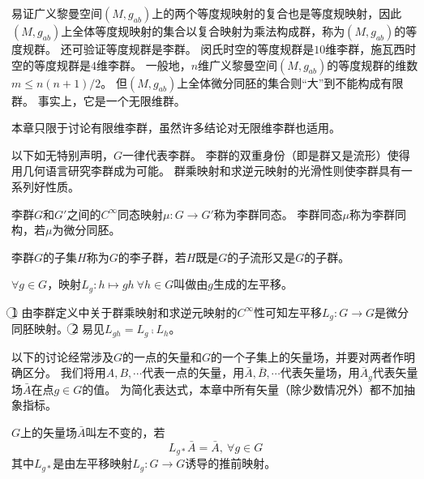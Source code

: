 \begin{example}
    易证广义黎曼空间$(M, g_{ab})$上的两个等度规映射的复合也是等度规映射，因此$(M, g_{ab})$上全体等度规映射的集合以复合映射为乘法构成群，称为$(M, g_{ab})$的等度规群。
    还可验证等度规群是李群。
    闵氏时空的等度规群是$10$维李群，施瓦西时空的等度规群是$4$维李群。
    一般地，$n$维广义黎曼空间$(M, g_{ab})$的等度规群的维数$m \leq n(n+1)/2$。
    但$(M, g_{ab})$上全体微分同胚的集合则``大''到不能构成有限群。
    事实上，它是一个无限维群。
\end{example}

\begin{note}
    本章只限于讨论有限维李群，虽然许多结论对无限维李群也适用。
\end{note}

以下如无特别声明，$G$一律代表李群。
李群的双重身份（即是群又是流形）使得用几何语言研究李群成为可能。
群乘映射和求逆元映射的光滑性则使李群具有一系列好性质。

\begin{definition}
    李群$G$和$G'$之间的$C^\infty$同态映射$\mu \colon G \to G'$称为李群同态。
    李群同态$\mu$称为李群同构，若$\mu$为微分同胚。
\end{definition}

\begin{definition}
    李群$G$的子集$H$称为$G$的李子群，若$H$既是$G$的子流形又是$G$的子群。
\end{definition}

\begin{definition}
    $\forall g \in G$，映射$L_g \colon h \mapsto gh ~ \forall h \in G$叫做由$g$生成的左平移。
\end{definition}

\begin{note}
    \textcircled{1} 由李群定义中关于群乘映射和求逆元映射的$C^\infty$性可知左平移$L_g \colon G \to G$是微分同胚映射。
    \textcircled{2} 易见$L_{gh} = L_g \comp L_h$。
\end{note}

以下的讨论经常涉及$G$的一点的矢量和$G$的一个子集上的矢量场，并要对两者作明确区分。
我们将用$A, B, \cdots$代表一点的矢量，用$\bar A, \bar B, \cdots$代表矢量场，用$\bar A_g$代表矢量场$\bar A$在点$g \in G$的值。
为简化表达式，本章中所有矢量（除少数情况外）都不加抽象指标。

\begin{definition}
    $G$上的矢量场$\bar A$叫左不变的，若
    $$L_{g*}\bar A = \bar A, ~ \forall g \in G$$
    其中$L_{g*}$是由左平移映射$L_g \colon G \to G$诱导的推前映射。
\end{definition}

